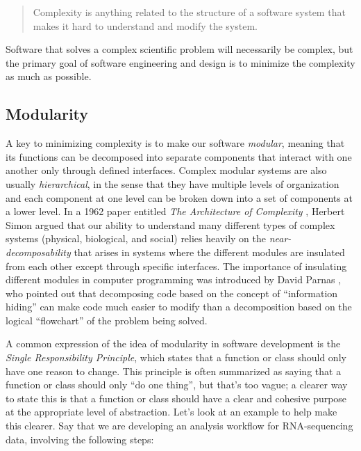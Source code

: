 \begin{quote}
Complexity is anything related to the structure of a software system that makes it hard to understand and modify the system.
\end{quote}

Software that solves a complex scientific problem will necessarily be complex, but the primary goal of software engineering and design is to minimize the complexity as much as possible. 

\subsection{Modularity}

A key to minimizing complexity is to make our software \textit{modular}, meaning that its functions can be decomposed into separate components that interact with one another only through defined interfaces.
Complex modular systems are also usually \textit{hierarchical}, in the sense that they have multiple levels of organization and each component at one level can be broken down into a set of components at a lower level.
In a 1962 paper entitled \textit{The Architecture of Complexity} \citep{Simon:1962aa}, Herbert Simon argued that our ability to understand many different types of complex systems (physical, biological, and social) relies heavily on the \textit{near-decomposability} that arises in systems where the different modules are insulated from each other except through specific interfaces.
The importance of insulating different modules in computer programming was introduced by David Parnas \citep{Parnas:1972aa}, who pointed out that decomposing code based on the concept of ``information hiding'' can make code much easier to modify than a decomposition based on the logical ``flowchart'' of the problem being solved.

A common expression of the idea of modularity in software development is the \textit{Single Responsibility Principle}, which states that a function or class should only have one reason to change.
This principle is often summarized as saying that a function or class should only ``do one thing'', but that's too vague; a clearer way to state this is that a function or class should have a clear and cohesive purpose at the appropriate level of abstraction.
Let's look at an example to help make this clearer.
Say that we are developing an analysis workflow for RNA-sequencing data, involving the following steps:

